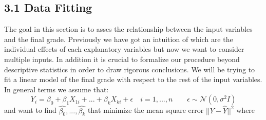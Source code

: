 \documentclass[a4paper, 11pt]{report}
\theoremstyle{definition}
\numberwithin{equation}{section}		%
\numberwithin{table}{section}				%
\begin{document}
\subsection*{3.1 Data Fitting}
The goal in this section is to asses the relationship between the input variables and the final grade. Previously we have got an intuition of which are the individual effects of each explanatory variables but now we want to consider multiple inputs. In addition it is crucial to formalize our procedure beyond descriptive statistics in order to draw rigorous conclusions. We will be trying to fit a linear model of the final grade with respect to the rest of the input variables. In general terms we assume that:
$$
Y_i = \beta_0 + \beta_1X_{1i} + ... +\beta_kX_{ki} + \epsilon \quad i = 1,...,n \quad \quad \epsilon \sim \mathcal{N}(0, \sigma^2I)
$$
and want to find $\hat{\beta_0},...,\hat{\beta_k}$ that minimize the mean square error $||Y-\hat{Y}||^2$ where 
\end{document}
